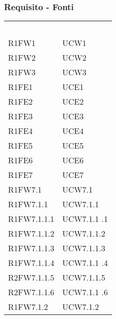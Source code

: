 \subsubsection{Requisito - Fonti}

\begin{table}[H]
\renewcommand{\arraystretch}{1.5}
\begin{tabular}[t]{ m{}<{\centering}  m{}<{\centering} }
	\rowcolor{darkblue}
	\textcolor{white}{\textbf{Requisito}} &\textcolor{white}{\textbf{Fonti}}\\ 	
	 
	R1FW1 & UCW1 \\	
	 
	R1FW2 & UCW2\\	

	R1FW3 & UCW3\\	
	 
	R1FE1 & UCE1\\	
	 
 	R1FE2 & UCE2\\	
	 
	R1FE3 & UCE3\\	

	R1FE4 & UCE4\\	
	
	R1FE5 & UCE5 \\
	 
	R1FE6 & UCE6 \\	 
	 
	R1FE7 & UCE7\\	
	
	R1FW7.1 & UCW7.1 \\

	R1FW7.1.1 & UCW7.1.1 \\
	
	R1FW7.1.1.1 & UCW7.1.1	.1 \\
	
	R1FW7.1.1.2 & UCW7.1.1.2 \\
	
	R1FW7.1.1.3 & UCW7.1.1.3 \\

	R1FW7.1.1.4 & UCW7.1.1	.4 \\
	
	R2FW7.1.1.5 & UCW7.1.1.5 \\
	
	R2FW7.1.1.6 & UCW7.1.1	.6 \\

	R1FW7.1.2 & UCW7.1.2 \\


\end{tabular}
\end{table}
